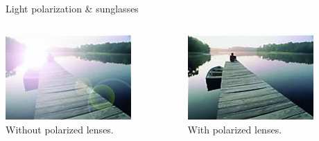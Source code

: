 \begin{frame}{Light polarization \& sunglasses}
\begin{columns}
  \begin{column}{0.50\textwidth}
    \begin{center}
       \includegraphics[width=0.75\textwidth]{./images/photos/lake_without_polarized_lenses.png}\\
       {\tiny
           Without polarized lenses.
       }
    \end{center}
  \end{column}
  \begin{column}{0.50\textwidth}
    \begin{center}
       \includegraphics[width=0.75\textwidth]{./images/photos/lake_with_polarized_lenses.png}\\
       {\tiny
           With polarized lenses.
       }
    \end{center}
  \end{column}
\end{columns}

\end{frame}

%
%
%

